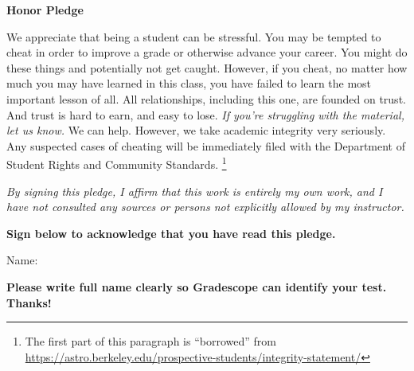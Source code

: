 
\vspace{0.5 cm}

\noindent{}

\vfill
\centerline{\bf Honor Pledge}  %

\bigskip

We appreciate that being a student can be stressful. You may be tempted to cheat in order to improve a grade or otherwise advance your career. You might do these things and potentially not get caught. However, if you cheat, no matter how much you may have learned in this class, you have failed to learn the most important lesson of all. All relationships, including this one, are founded on trust. And trust is hard to earn, and easy to lose. \emph{If you're struggling with the material, let us know.} We can help. However, we take academic integrity very seriously. Any suspected cases of cheating will be immediately filed with the Department of Student Rights and Community Standards.  \footnote[1]{The first part of this paragraph is ``borrowed'' from \url{https://astro.berkeley.edu/prospective-students/integrity-statement/}}


\vspace{0.5 cm}

\emph{By signing this pledge, I affirm that this work is entirely my own work, and I have not consulted any sources or persons not explicitly allowed by my instructor.}

\vspace{0.5 cm}

\textbf{Sign below to acknowledge that you have read this pledge.} %

\vspace{0.5 cm}

Name: \underline{\hspace{10 cm}}  

{\bf Please write full name clearly so Gradescope can identify your test.  Thanks!}

\vspace{0.5 cm}

